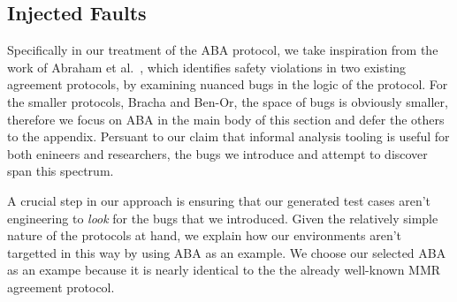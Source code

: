 \subsection{Injected Faults}
Specifically in our treatment of the ABA protocol, we take inspiration from the work of Abraham et al.~\cite{dahliabugs}, which identifies safety violations in two existing agreement protocols, by examining nuanced bugs in the logic of the protocol. 
For the smaller protocols, Bracha and Ben-Or, the space of bugs is obviously smaller, therefore we focus on ABA in the main body of this section and defer the others to the appendix. 
Persuant to our claim that informal analysis tooling is useful for both enineers and researchers, the bugs we introduce and attempt to discover span this spectrum. 

A crucial step in our approach is ensuring that our generated test cases aren't engineering to \emph{look} for the bugs that we introduced.
Given the relatively simple nature of the protocols at hand, we explain how our environments aren't targetted in this way by using ABA as an example. 
We choose our selected ABA as an exampe because it is nearly identical to the the already well-known MMR agreement protocol.

